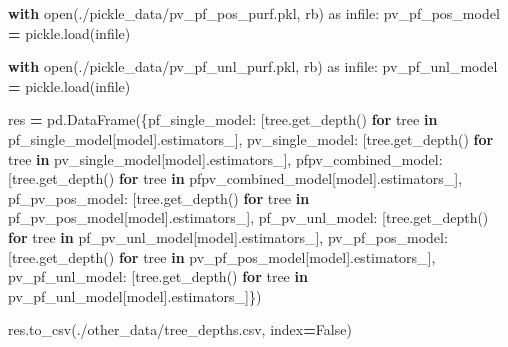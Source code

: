 \documentclass[
  11pt,
  oneside]{book}
\newenvironment{Shaded}{\begin{snugshade}}{\end{snugshade}}
\newcommand{\BuiltInTok}[1]{#1}
\newcommand{\ControlFlowTok}[1]{\textcolor[rgb]{0.13,0.29,0.53}{\textbf{#1}}}
\newcommand{\ImportTok}[1]{#1}
\newcommand{\KeywordTok}[1]{\textcolor[rgb]{0.13,0.29,0.53}{\textbf{#1}}}
\newcommand{\NormalTok}[1]{#1}
\newcommand{\OperatorTok}[1]{\textcolor[rgb]{0.81,0.36,0.00}{\textbf{#1}}}
\newcommand{\StringTok}[1]{\textcolor[rgb]{0.31,0.60,0.02}{#1}}
\newcommand{\VariableTok}[1]{\textcolor[rgb]{0.00,0.00,0.00}{#1}}
\begin{document}
\begin{Shaded}
\begin{Highlighting}[]
\ControlFlowTok{with} \BuiltInTok{open}\NormalTok{(}\StringTok{\textquotesingle{}./pickle\_data/pv\_pf\_pos\_purf.pkl\textquotesingle{}}\NormalTok{, }\StringTok{\textquotesingle{}rb\textquotesingle{}}\NormalTok{) }\ImportTok{as}\NormalTok{ infile:}
\NormalTok{    pv\_pf\_pos\_model }\OperatorTok{=}\NormalTok{ pickle.load(infile)}
    
\ControlFlowTok{with} \BuiltInTok{open}\NormalTok{(}\StringTok{\textquotesingle{}./pickle\_data/pv\_pf\_unl\_purf.pkl\textquotesingle{}}\NormalTok{, }\StringTok{\textquotesingle{}rb\textquotesingle{}}\NormalTok{) }\ImportTok{as}\NormalTok{ infile:}
\NormalTok{    pv\_pf\_unl\_model }\OperatorTok{=}\NormalTok{ pickle.load(infile)}

\NormalTok{res }\OperatorTok{=}\NormalTok{ pd.DataFrame(\{}\StringTok{\textquotesingle{}pf\_single\_model\textquotesingle{}}\NormalTok{: [tree.get\_depth() }\ControlFlowTok{for}\NormalTok{ tree }\KeywordTok{in}\NormalTok{ pf\_single\_model[}\StringTok{\textquotesingle{}model\textquotesingle{}}\NormalTok{].estimators\_],}
                    \StringTok{\textquotesingle{}pv\_single\_model\textquotesingle{}}\NormalTok{: [tree.get\_depth() }\ControlFlowTok{for}\NormalTok{ tree }\KeywordTok{in}\NormalTok{ pv\_single\_model[}\StringTok{\textquotesingle{}model\textquotesingle{}}\NormalTok{].estimators\_],}
                    \StringTok{\textquotesingle{}pfpv\_combined\_model\textquotesingle{}}\NormalTok{: [tree.get\_depth() }\ControlFlowTok{for}\NormalTok{ tree }\KeywordTok{in}\NormalTok{ pfpv\_combined\_model[}\StringTok{\textquotesingle{}model\textquotesingle{}}\NormalTok{].estimators\_],}
                    \StringTok{\textquotesingle{}pf\_pv\_pos\_model\textquotesingle{}}\NormalTok{: [tree.get\_depth() }\ControlFlowTok{for}\NormalTok{ tree }\KeywordTok{in}\NormalTok{ pf\_pv\_pos\_model[}\StringTok{\textquotesingle{}model\textquotesingle{}}\NormalTok{].estimators\_],}
                    \StringTok{\textquotesingle{}pf\_pv\_unl\_model\textquotesingle{}}\NormalTok{: [tree.get\_depth() }\ControlFlowTok{for}\NormalTok{ tree }\KeywordTok{in}\NormalTok{ pf\_pv\_unl\_model[}\StringTok{\textquotesingle{}model\textquotesingle{}}\NormalTok{].estimators\_],}
                    \StringTok{\textquotesingle{}pv\_pf\_pos\_model\textquotesingle{}}\NormalTok{: [tree.get\_depth() }\ControlFlowTok{for}\NormalTok{ tree }\KeywordTok{in}\NormalTok{ pv\_pf\_pos\_model[}\StringTok{\textquotesingle{}model\textquotesingle{}}\NormalTok{].estimators\_],}
                    \StringTok{\textquotesingle{}pv\_pf\_unl\_model\textquotesingle{}}\NormalTok{: [tree.get\_depth() }\ControlFlowTok{for}\NormalTok{ tree }\KeywordTok{in}\NormalTok{ pv\_pf\_unl\_model[}\StringTok{\textquotesingle{}model\textquotesingle{}}\NormalTok{].estimators\_]\})}

\NormalTok{res.to\_csv(}\StringTok{\textquotesingle{}./other\_data/tree\_depths.csv\textquotesingle{}}\NormalTok{, index}\OperatorTok{=}\VariableTok{False}\NormalTok{)}
\end{Highlighting}
\end{Shaded}
\end{document}
